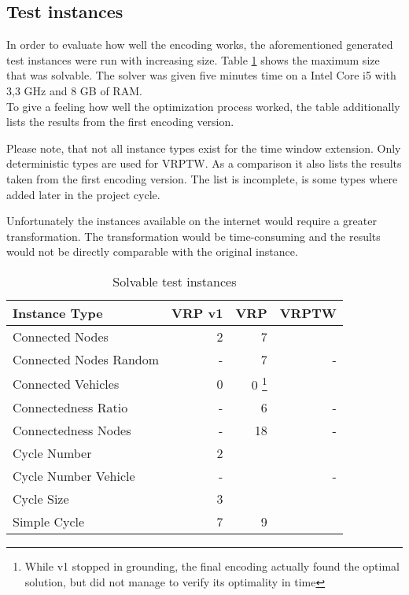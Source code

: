 \documentclass[12pt, letterpaper]{article}
\begin{document}
\subsection{Test instances}
In order to evaluate how well the encoding works, the aforementioned generated test instances were run with increasing size. Table \ref{table:benchmark} shows the maximum size that was solvable. The solver was given five minutes time on a Intel Core i5 with 3,3 GHz and 8 GB of RAM.\\
To give a feeling how well the optimization process worked, the table additionally lists the results from the first encoding version.

Please note, that not all instance types exist for the time window extension. Only deterministic types are used for VRPTW.
As a comparison it also lists the results taken from the first encoding version. The list is incomplete, is some types where added later in the project cycle.

Unfortunately the instances available on the internet would require a greater transformation. The transformation would be time-consuming and the results would not be directly comparable with the original instance.

\begin{table}
\begin{tabular}{l | r | r | r}
Instance Type			& VRP v1	& VRP	& VRPTW\\
\hline
Connected Nodes			& 2			& 7		& \\
Connected Nodes Random	& -			& 7		& -\\
Connected Vehicles		& 0			& 0 \footnote{While v1 stopped in grounding, the final encoding actually found the optimal solution, but did not manage to verify its optimality in time}	& \\
Connectedness Ratio		& -			& 6		& -\\
Connectedness Nodes		& -			& 18	& -\\
Cycle Number			& 2			& 		& \\
Cycle Number Vehicle	& -			& 		& -\\
Cycle Size				& 3 		& 		& \\
Simple Cycle			& 7			& 9		& \\
\end{tabular}
\caption{Solvable test instances}
\label{table:benchmark}
\end{table}
\end{document}
